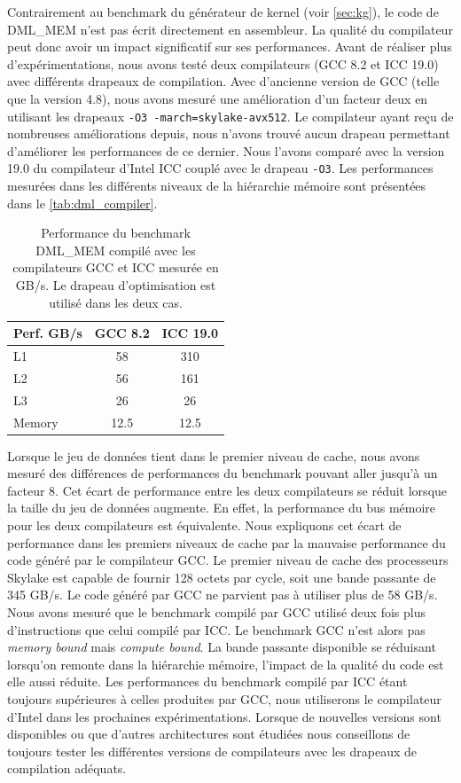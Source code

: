        Contrairement au benchmark du générateur de kernel (voir \autoref{sec:kg}), le code de DML\_MEM n'est pas écrit directement en assembleur. La qualité du compilateur peut donc avoir un impact significatif sur ses performances. Avant de réaliser plus d'expérimentations, nous avons testé deux compilateurs (GCC 8.2 et ICC 19.0) avec différents drapeaux de compilation. Avec d'ancienne version de GCC (telle que la version 4.8), nous avons mesuré une amélioration d'un facteur deux en utilisant les drapeaux \verb|-O3 -march=skylake-avx512|. Le compilateur ayant reçu de nombreuses améliorations depuis, nous n'avons trouvé aucun drapeau permettant d'améliorer les performances de ce dernier. Nous l'avons comparé avec la version 19.0 du compilateur d'Intel ICC couplé avec le drapeau \verb|-O3|. Les performances mesurées dans les différents niveaux de la hiérarchie mémoire sont présentées dans le \autoref{tab:dml_compiler}.

        \begin{table}[]
        \centering
        \begin{tabular}{|l|c|c|}
        \hline
        Perf. GB/s & GCC 8.2 & ICC 19.0 \\ \hline
        L1 & 58 & 310 \\ \hline
        L2 & 56 & 161 \\ \hline
        L3 & 26 & 26 \\ \hline
        Memory & 12.5 & 12.5 \\ \hline
        \end{tabular}%
        \caption{Performance du benchmark DML\_MEM compilé avec les compilateurs GCC et ICC mesurée en GB/s. Le drapeau d'optimisation  est utilisé dans les deux cas.}
        \label{tab:dml_compiler}
        \end{table}

        Lorsque le jeu de données tient dans le premier niveau de cache, nous avons mesuré des différences de performances du benchmark pouvant aller jusqu'à un facteur 8. Cet écart de performance entre les deux compilateurs se réduit lorsque la taille du jeu de données augmente. En effet, la performance du bus mémoire pour les deux compilateurs est équivalente. Nous expliquons cet écart de performance dans les premiers niveaux de cache par la mauvaise performance du code généré par le compilateur GCC. Le premier niveau de cache des processeurs Skylake est capable de fournir 128 octets par cycle, soit une bande passante de 345 GB/s. Le code généré par GCC ne parvient pas à utiliser plus de 58 GB/s. Nous avons mesuré que le benchmark compilé par GCC utilisé deux fois plus d'instructions que celui compilé par ICC. Le benchmark GCC n'est alors pas \textit{memory bound} mais \textit{compute bound}. La bande passante disponible se réduisant lorsqu'on remonte dans la hiérarchie mémoire, l'impact de la qualité du code est elle aussi réduite. Les performances du benchmark compilé par ICC étant toujours supérieures à celles produites par GCC, nous utiliserons le compilateur d'Intel dans les prochaines expérimentations. Lorsque de nouvelles versions sont disponibles ou que d'autres architectures sont étudiées nous conseillons de toujours tester les différentes versions de compilateurs avec les drapeaux de compilation adéquats.
    

